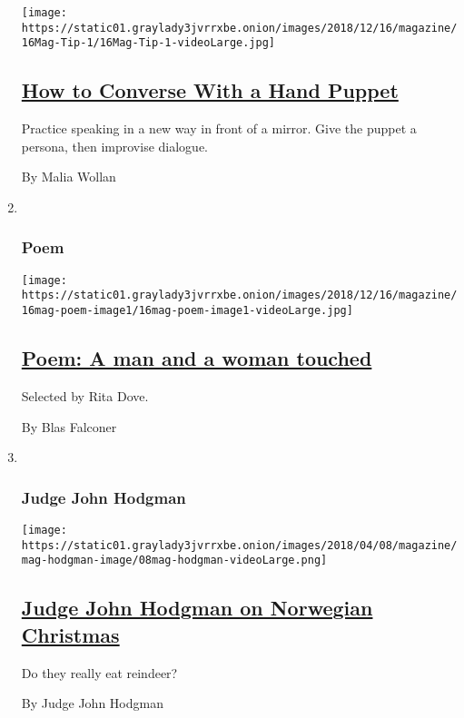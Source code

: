 \begin{enumerate}
  \texttt{[image: https://static01.graylady3jvrrxbe.onion/images/2018/12/16/magazine/16Mag-Tip-1/16Mag-Tip-1-videoLarge.jpg]}

  \hypertarget{how-to-converse-with-a-hand-puppet}{%
  \subsection{\texorpdfstring{\href{/2018/12/12/magazine/how-to-converse-with-a-hand-puppet.html}{How
  to Converse With a Hand
  Puppet}}{How to Converse With a Hand Puppet}}\label{how-to-converse-with-a-hand-puppet}}

  Practice speaking in a new way in front of a mirror. Give the puppet a
  persona, then improvise dialogue.

  By Malia Wollan
\item ~
  \hypertarget{poem}{%
  \subsubsection{Poem}\label{poem}}

  \texttt{[image: https://static01.graylady3jvrrxbe.onion/images/2018/12/16/magazine/16mag-poem-image1/16mag-poem-image1-videoLarge.jpg]}

  \hypertarget{poem-a-man-and-a-woman-touched}{%
  \subsection{\texorpdfstring{\href{/2018/12/14/magazine/poem-a-man-and-a-woman-touched.html}{Poem:
  A man and a woman
  touched}}{Poem: A man and a woman touched}}\label{poem-a-man-and-a-woman-touched}}

  Selected by Rita Dove.

  By Blas Falconer
\item ~
  \hypertarget{judge-john-hodgman}{%
  \subsubsection{Judge John Hodgman}\label{judge-john-hodgman}}

  \texttt{[image: https://static01.graylady3jvrrxbe.onion/images/2018/04/08/magazine/mag-hodgman-image/08mag-hodgman-videoLarge.png]}

  \hypertarget{judge-john-hodgman-on-norwegian-christmas}{%
  \subsection{\texorpdfstring{\href{/2018/12/14/magazine/judge-john-hodgman-on-norwegian-christmas.html}{Judge
  John Hodgman on Norwegian
  Christmas}}{Judge John Hodgman on Norwegian Christmas}}\label{judge-john-hodgman-on-norwegian-christmas}}

  Do they really eat reindeer?

  By Judge John Hodgman
\end{enumerate}

